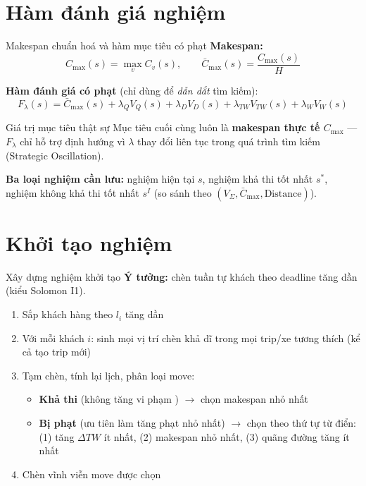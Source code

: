 \documentclass[aspectratio=169]{beamer}
\newcommand{\hl}[1]{\textcolor{blue!60!black}{\textbf{#1}}}
\begin{document}
\section{Hàm đánh giá nghiệm}

\begin{frame}{Makespan chuẩn hoá và hàm mục tiêu có phạt}
  \textbf{Makespan:}
  $$C_{\max}(s) = \max_v C_v(s), \qquad \bar{C}_{\max}(s) = \frac{C_{\max}(s)}{H}$$

  \textbf{Hàm đánh giá có phạt} (chỉ dùng để \emph{dẫn dắt} tìm kiếm):
  $$F_\lambda(s) = \bar{C}_{\max}(s) + \lambda_Q V_Q(s) + \lambda_D V_D(s) + \lambda_{TW} V_{TW}(s) + \lambda_W V_W(s)$$

  \begin{alertblock}{Giá trị mục tiêu thật sự}
    Mục tiêu cuối cùng luôn là \hl{makespan thực tế $C_{\max}$} — $F_\lambda$ chỉ hỗ trợ định hướng vì $\lambda$ thay đổi liên tục trong quá trình tìm kiếm (Strategic Oscillation).
  \end{alertblock}

  \textbf{Ba loại nghiệm cần lưu:} nghiệm hiện tại $s$, nghiệm khả thi tốt nhất $s^*$, nghiệm không khả thi tốt nhất $s^I$ (so sánh theo $(V_\Sigma, \bar{C}_{\max}, \text{Distance})$).
\end{frame}

\section{Khởi tạo nghiệm}

\begin{frame}{Xây dựng nghiệm khởi tạo}
  \textbf{Ý tưởng:} chèn tuần tự khách theo deadline tăng dần (kiểu Solomon I1).

  \begin{enumerate}
    \item Sắp khách hàng theo $l_i$ tăng dần
    \item Với mỗi khách $i$: sinh mọi vị trí chèn khả dĩ trong mọi trip/xe tương thích (kể cả tạo trip mới)
    \item Tạm chèn, tính lại lịch, phân loại move:
    \begin{itemize}
      \item \textbf{Khả thi} (không tăng vi phạm ) $\to$ chọn makespan nhỏ nhất
      \item \textbf{Bị phạt} (ưu tiên làm tăng phạt nhỏ nhất) $\to$ chọn theo thứ tự từ điển: \\
        (1) tăng $\Delta TW$ ít nhất, (2) makespan nhỏ nhất, (3) quãng đường tăng ít nhất
    \end{itemize}
    \item Chèn vĩnh viễn move được chọn
  \end{enumerate}

  \vspace{2mm}
\end{frame}
\end{document}
